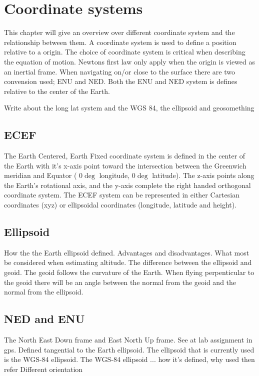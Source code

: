 
\chapter{Coordinate systems}
This chapter will give an overview over different coordinate system and the relationship between them. A coordinate system is used to define a position relative to a origin. The choice of coordinate system is critical when describing the equation of motion. Newtons first law only apply when the origin is viewed as an inertial frame. When navigating on/or close to the surface there are two convension used; ENU and NED. Both the ENU and NED system is defines relative to the center of the Earth.

Write about the long lat system and the WGS 84, the ellipsoid and geosomething
\section{ECEF}
The Earth Centered, Earth Fixed coordinate system is defined in the center of the Earth with it's x-axis point toward the intersection between the Greenwich meridian and Equator ( $0\deg $ longitude, $0\deg $ latitude). The z-axis points along the Earth's rotational axis, and the y-axis complete the right handed orthogonal coordinate system. The ECEF system can be represented in either Cartesian coordinates (xyz) or ellipsoidal coordinates (longitude, latitude and height). 
\section{Ellipsoid}
How the the Earth ellipsoid defined. Advantages and disadvantages. What most be considered when estimating altitude. The difference between the ellipsoid and geoid. The geoid follows the curvature of the Earth. When flying perpenticular to the geoid there will be an angle between the normal from the geoid and the normal from the ellipsoid. 
\section{NED and ENU}
The North East Down frame and East North Up frame. See at lab assignment in gps.
Defined tangential to the Earth ellipsoid. The ellipsoid that is currently used is the WGS-84 ellipsoid. The WGS-84 ellipsoid ... how it's defined, why used then refer
Different orientation
\cleardoublepage